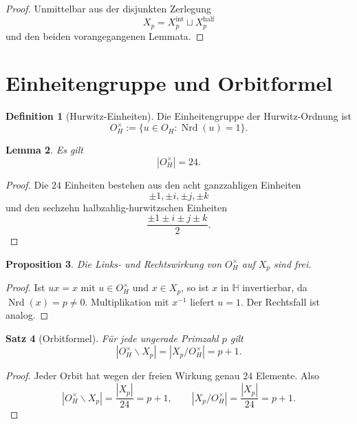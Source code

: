 \documentclass[a4paper,12pt]{article}
\newtheorem{satz}{Satz}[section]
\newtheorem{lemma}[satz]{Lemma}
\newtheorem{proposition}[satz]{Proposition}
\theoremstyle{definition}
\newtheorem{definition}[satz]{Definition}
\numberwithin{equation}{section}
\newcommand{\OH}{O_H}
\newcommand{\HH}{\mathbb{H}}
\newcommand{\Nrd}{\operatorname{Nrd}}
\begin{document}
	\begin{proof}
		Unmittelbar aus der disjunkten Zerlegung
		\[
		X_p=X_p^{\mathrm{int}}\sqcup X_p^{\mathrm{half}}
		\]
		und den beiden vorangegangenen Lemmata.
	\end{proof}
	
	\section{Einheitengruppe und Orbitformel}
	
	\begin{definition}[Hurwitz-Einheiten]
		Die Einheitengruppe der Hurwitz-Ordnung ist
		\[
		\OH^\times:=\{u\in \OH:\Nrd(u)=1\}.
		\]
	\end{definition}
	
	\begin{lemma}
		Es gilt
		\[
		|\OH^\times|=24.
		\]
	\end{lemma}
	
	\begin{proof}
		Die \(24\) Einheiten bestehen aus den acht ganzzahligen Einheiten
		\[
		\pm1,\pm i,\pm j,\pm k
		\]
		und den sechzehn halbzahlig-hurwitzschen Einheiten
		\[
		\frac{\pm1\pm i\pm j\pm k}{2}.
		\]
	\end{proof}
	
	\begin{proposition}
		Die Links- und Rechtswirkung von \(\OH^\times\) auf \(X_p\) sind frei.
	\end{proposition}
	
	\begin{proof}
		Ist \(ux=x\) mit \(u\in \OH^\times\) und \(x\in X_p\), so ist \(x\) in \(\HH\) invertierbar, da \(\Nrd(x)=p\neq 0\). Multiplikation mit \(x^{-1}\) liefert \(u=1\). Der Rechtsfall ist analog.
	\end{proof}
	
	\begin{satz}[Orbitformel]
		Für jede ungerade Primzahl \(p\) gilt
		\[
		|\OH^\times\backslash X_p|
		=
		|X_p/\OH^\times|
		=
		p+1.
		\]
	\end{satz}
	
	\begin{proof}
		Jeder Orbit hat wegen der freien Wirkung genau \(24\) Elemente. Also
		\[
		|\OH^\times\backslash X_p|=\frac{|X_p|}{24}=p+1,
		\qquad
		|X_p/\OH^\times|=\frac{|X_p|}{24}=p+1.
		\]
	\end{proof}
	
\end{document}

